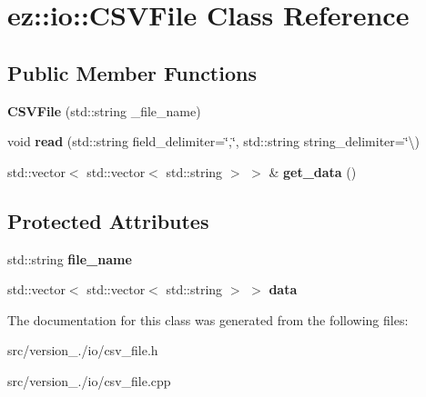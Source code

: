 \hypertarget{classez_1_1io_1_1CSVFile}{}\section{ez\+:\+:io\+:\+:C\+S\+V\+File Class Reference}
\label{classez_1_1io_1_1CSVFile}
\subsection*{Public Member Functions}
\begin{DoxyCompactItemize}
\item 
\mbox{\label{classez_1_1io_1_1CSVFile_aab1cc6fb7d8eae0ea5a0f57f1485e9b5}} 
{\bfseries C\+S\+V\+File} (std\+::string \+\_\+file\+\_\+name)
\item 
\mbox{\label{classez_1_1io_1_1CSVFile_a84c8046d38d948e93c062546492ccbaa}} 
void {\bfseries read} (std\+::string field\+\_\+delimiter=\char`\"{},\char`\"{}, std\+::string string\+\_\+delimiter=\char`\"{}\textbackslash{})
\item 
\mbox{\label{classez_1_1io_1_1CSVFile_a862894d8b84c39a2a35a339f3c0341cb}} 
std\+::vector$<$ std\+::vector$<$ std\+::string $>$ $>$ \& {\bfseries get\+\_\+data} ()
\end{DoxyCompactItemize}
\subsection*{Protected Attributes}
\begin{DoxyCompactItemize}
\item 
\mbox{\label{classez_1_1io_1_1CSVFile_ae37f393dbc90ba6397702bc543a2b4da}} 
std\+::string {\bfseries file\+\_\+name}
\item 
\mbox{\label{classez_1_1io_1_1CSVFile_ae73026e2bda2371a557f96ff61134ad9}} 
std\+::vector$<$ std\+::vector$<$ std\+::string $>$ $>$ {\bfseries data}
\end{DoxyCompactItemize}


The documentation for this class was generated from the following files\+:\begin{DoxyCompactItemize}
\item 
src/version\+\_./io/csv\+\_\+file.\+h\item 
src/version\+\_./io/csv\+\_\+file.\+cpp\end{DoxyCompactItemize}
